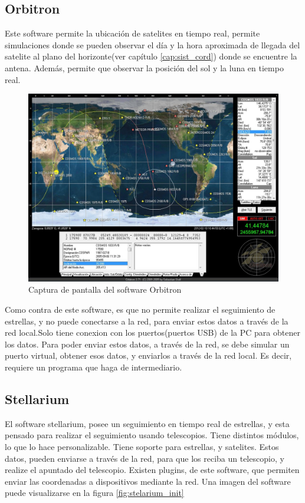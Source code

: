 \subsection{Orbitron}
Este software permite la ubicación de satelites en tiempo real, permite simulaciones donde se pueden observar el día y la hora aproximada de llegada del satelite al plano del horizonte(ver capítulo \ref{cap:sist_cord}) donde se encuentre la antena. 
Además, permite que observar la posición del sol y la luna en tiempo real. 

\begin{figure}[ht]
	\centering
	\includegraphics[scale=0.4]{orbitron}
	\caption{Captura de pantalla del software Orbitron }
\end{figure}

Como contra de este software, es que no permite realizar el seguimiento de estrellas, y no puede conectarse a la red, para enviar estos datos a través de la red local.Solo tiene conexion con los puertos(puertos USB) de la PC para obtener los datos. Para poder enviar estos datos, a través de la red, se debe simular un puerto virtual, obtener esos datos, y enviarlos a través de la red local. Es decir, requiere un programa que haga de intermediario. 

\subsection{Stellarium} 
El software stellarium, posee un seguimiento en tiempo real de estrellas, y esta pensado para realizar el seguimiento usando telescopios. Tiene distintos módulos, lo que lo hace personalizable. Tiene soporte para estrellas, y satelites. Estos datos, pueden enviarse a través de la red, para que los reciba un telescopio, y realize el apuntado del telescopio. Existen plugins, de este software, que permiten enviar las coordenadas a dispositivos mediante la red. Una imagen del software puede visualizarse en la figura \ref{fig:stelarium_init}  


